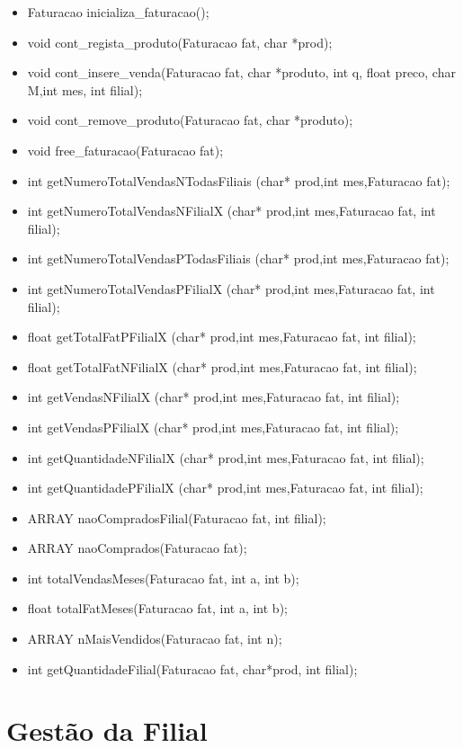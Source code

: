 \begin{itemize}

\item	Faturacao inicializa\_faturacao();
\item	void cont\_regista\_produto(Faturacao fat, char *prod);
\item	void cont\_insere\_venda(Faturacao fat, char *produto, int q, float preco, char M,int mes, int filial);
\item	void cont\_remove\_produto(Faturacao fat, char *produto);
\item	void free\_faturacao(Faturacao fat);
\item	int getNumeroTotalVendasNTodasFiliais (char* prod,int mes,Faturacao fat);
\item	int getNumeroTotalVendasNFilialX (char* prod,int mes,Faturacao fat, int filial);
\item	int getNumeroTotalVendasPTodasFiliais (char* prod,int mes,Faturacao fat);
\item	int getNumeroTotalVendasPFilialX (char* prod,int mes,Faturacao fat, int filial);
\item	float getTotalFatPFilialX (char* prod,int mes,Faturacao fat, int filial);
\item	float getTotalFatNFilialX (char* prod,int mes,Faturacao fat, int filial);
\item	int getVendasNFilialX (char* prod,int mes,Faturacao fat, int filial);
\item	int getVendasPFilialX (char* prod,int mes,Faturacao fat, int filial);
\item	int getQuantidadeNFilialX (char* prod,int mes,Faturacao fat, int filial);
\item	int getQuantidadePFilialX (char* prod,int mes,Faturacao fat, int filial);
\item	ARRAY naoCompradosFilial(Faturacao fat, int filial);
\item	ARRAY naoComprados(Faturacao fat);
\item	int totalVendasMeses(Faturacao fat, int a, int b);
\item	float totalFatMeses(Faturacao fat, int a, int b);
\item	ARRAY nMaisVendidos(Faturacao fat, int n);
\item	int getQuantidadeFilial(Faturacao fat, char*prod, int filial);
	
\end{itemize}


\section{Gestão da Filial}


